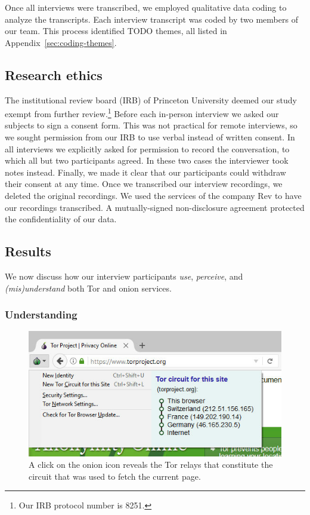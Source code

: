 Once all interviews were transcribed, we employed qualitative data coding to
analyze the transcripts.  Each interview transcript was coded by two members of
our team.  This process identified TODO themes, all listed in
Appendix~\ref{sec:coding-themes}.

\subsection{Research ethics}

The institutional review board (IRB) of Princeton University deemed our study
exempt from further review.\footnote{Our IRB protocol number is 8251.}  Before
each in-person interview we asked our subjects to sign a consent form.  This
was not practical for remote interviews, so we sought permission from our IRB
to use verbal instead of written consent.  In all interviews we explicitly
asked for permission to record the conversation, to which all but two
participants agreed.  In these two cases the interviewer took notes instead.
Finally, we made it clear that our participants could withdraw their consent at
any time.  Once we transcribed our interview recordings, we deleted the
original recordings.  We used the services of the company Rev to have our
recordings transcribed.  A mutually-signed non-disclosure agreement protected
the confidentiality of our data.

\subsection{Results}

We now discuss how our interview participants \emph{use}, \emph{perceive}, and
\emph{(mis)understand} both Tor and onion services.

\subsubsection{Understanding}

\begin{figure}[t]
    \centering
    \includegraphics[width=\linewidth]{figures/tor-button-screenshot.jpg}
    \caption{A click on the onion icon reveals the Tor relays that constitute
    the circuit that was used to fetch the current page.}
    \label{fig:tor-button}
\end{figure}

